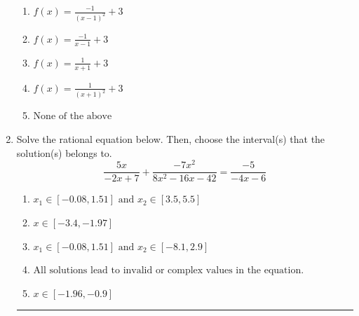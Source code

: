 \documentclass[14pt]{extbook}
\newcommand{\litem}[1]{\item#1\hspace*{-1cm}\rule{\textwidth}{0.4pt}}
\begin{document}
\begin{enumerate}
{\begin{center}
\end{center}
\begin{enumerate}[label=\Alph*.]
\item \( f(x) = \frac{-1}{(x - 1)^2} + 3 \)
\item \( f(x) = \frac{-1}{x - 1} + 3 \)
\item \( f(x) = \frac{1}{x + 1} + 3 \)
\item \( f(x) = \frac{1}{(x + 1)^2} + 3 \)
\item \( \text{None of the above} \)

\end{enumerate} }
\litem{
Solve the rational equation below. Then, choose the interval(s) that the solution(s) belongs to.\[ \frac{5x}{-2x + 7} + \frac{-7x^{2}}{8x^{2} -16 x -42} = \frac{-5}{-4x -6} \]\begin{enumerate}[label=\Alph*.]
\item \( x_1 \in [-0.08, 1.51] \text{ and } x_2 \in [3.5,5.5] \)
\item \( x \in [-3.4,-1.97] \)
\item \( x_1 \in [-0.08, 1.51] \text{ and } x_2 \in [-8.1,2.9] \)
\item \( \text{All solutions lead to invalid or complex values in the equation.} \)
\item \( x \in [-1.96,-0.9] \)

\end{enumerate} }
\end{enumerate}
\end{document}
